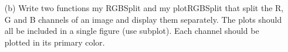 \begin{enumerate}
        \\\\
        \item[(b)] Write two functions my RGBSplit and my plotRGBSplit that split the R, G and B channels of an image and display them separately. The plots should all be included in a single figure (use subplot). Each channel should be plotted in its primary color.
        \\\\
    \end{enumerate}

